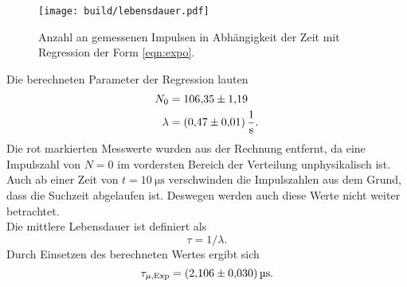 \begin{figure}[H]
  \centering
  \texttt{[image: build/lebensdauer.pdf]}
  \caption{Anzahl an gemessenen Impulsen in Abhängigkeit der Zeit mit Regression der Form \ref{eqn:expo}.}
  \label{fig:lebensdauer}
\end{figure}
\noindent
Die berechneten Parameter der Regression lauten
\begin{align*}
  N_0    &=\num{106.35 \pm 1.19} \\
  \lambda&=\SI{0.47 \pm 0.01}{\per\second}.
\end{align*}
Die rot markierten Messwerte wurden aus der Rechnung entfernt, da eine Impulszahl von $N=0$ im vordersten Bereich der Verteilung unphysikalisch ist. Auch ab einer 
Zeit von $t=\SI{10}{\micro\second}$ verschwinden die Impulszahlen aus dem Grund, dass die Suchzeit abgelaufen ist. Deswegen werden auch diese Werte nicht weiter
betrachtet.
\\\noindent
Die mittlere Lebensdauer ist definiert als
\begin{equation*}
  \tau=1/\lambda .
\end{equation*}
Durch Einsetzen des berechneten Wertes ergibt sich 
\begin{equation*}
  \tau_{\mu,\text{Exp}}=\SI{2.106\pm0.030}{\micro\second}.
\end{equation*}